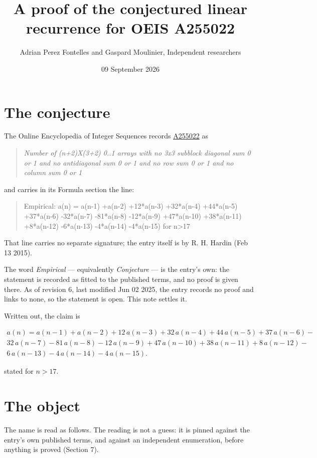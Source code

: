 \documentclass[11pt]{article}
\title{A proof of the conjectured linear recurrence for OEIS A255022}
\author{Adrian Perez Fontelles and Gaspard Moulinier, Independent researchers}
\date{09 September 2026}
\theoremstyle{definition}
\begin{document}
\maketitle
\section{The conjecture}

The Online Encyclopedia of Integer Sequences records \href{https://oeis.org/A255022}{A255022} as

\begin{quote}\itshape Number of (n+2)X(3+2) 0..1 arrays with no 3x3 subblock diagonal sum 0 or 1 and no antidiagonal sum 0 or 1 and no row sum 0 or 1 and no column sum 0 or 1\end{quote}

and carries in its Formula section the line:

\begin{quote}\ttfamily Empirical: a(n) = a(n-1) +a(n-2) +12*a(n-3) +32*a(n-4) +44*a(n-5) +37*a(n-6) -32*a(n-7) -81*a(n-8) -12*a(n-9) +47*a(n-10) +38*a(n-11) +8*a(n-12) -6*a(n-13) -4*a(n-14) -4*a(n-15) for n>17\end{quote}

That line carries no separate signature; the entry itself is by R. H. Hardin (Feb 13 2015).

The word {\itshape Empirical} --- equivalently {\itshape Conjecture} --- is the entry's own: the statement is recorded as fitted to the published terms, and no proof is given there. As of revision 6, last modified Jun 02 2025, the entry records no proof and links to none, so the statement is open. This note settles it.

Written out, the claim is

\begin{multline*} a(n) = a(n-1) + a(n-2) + 12\,a(n-3) + 32\,a(n-4) + 44\,a(n-5) + 37\,a(n-6) - \\ 32\,a(n-7) - 81\,a(n-8) - 12\,a(n-9) + 47\,a(n-10) + 38\,a(n-11) + 8\,a(n-12) - \\ 6\,a(n-13) - 4\,a(n-14) - 4\,a(n-15). \end{multline*}

stated for $n > 17$.

\section{The object}

The name is read as follows. The reading is not a guess: it is pinned against the entry's own published terms, and against an independent enumeration, before anything is proved (Section 7).
\end{document}
